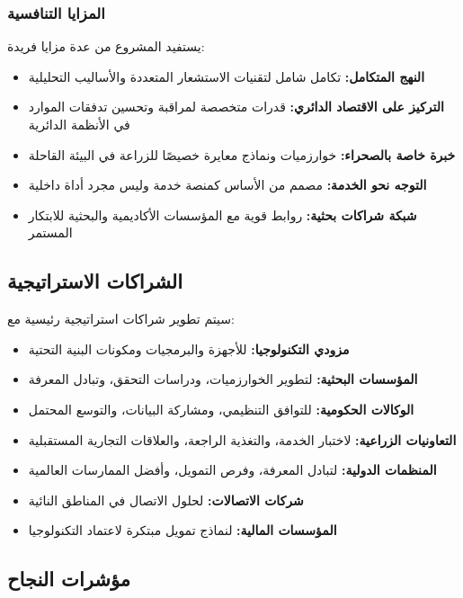 \subsubsection{المزايا التنافسية}
يستفيد المشروع من عدة مزايا فريدة:

\begin{itemize}
    \item \textbf{النهج المتكامل:} تكامل شامل لتقنيات الاستشعار المتعددة والأساليب التحليلية
    \item \textbf{التركيز على الاقتصاد الدائري:} قدرات متخصصة لمراقبة وتحسين تدفقات الموارد في الأنظمة الدائرية
    \item \textbf{خبرة خاصة بالصحراء:} خوارزميات ونماذج معايرة خصيصًا للزراعة في البيئة القاحلة
    \item \textbf{التوجه نحو الخدمة:} مصمم من الأساس كمنصة خدمة وليس مجرد أداة داخلية
    \item \textbf{شبكة شراكات بحثية:} روابط قوية مع المؤسسات الأكاديمية والبحثية للابتكار المستمر
\end{itemize}

\subsection{الشراكات الاستراتيجية}

سيتم تطوير شراكات استراتيجية رئيسية مع:

\begin{itemize}
    \item \textbf{مزودي التكنولوجيا:} للأجهزة والبرمجيات ومكونات البنية التحتية
    \item \textbf{المؤسسات البحثية:} لتطوير الخوارزميات، ودراسات التحقق، وتبادل المعرفة
    \item \textbf{الوكالات الحكومية:} للتوافق التنظيمي، ومشاركة البيانات، والتوسع المحتمل
    \item \textbf{التعاونيات الزراعية:} لاختبار الخدمة، والتغذية الراجعة، والعلاقات التجارية المستقبلية
    \item \textbf{المنظمات الدولية:} لتبادل المعرفة، وفرص التمويل، وأفضل الممارسات العالمية
    \item \textbf{شركات الاتصالات:} لحلول الاتصال في المناطق النائية
    \item \textbf{المؤسسات المالية:} لنماذج تمويل مبتكرة لاعتماد التكنولوجيا
\end{itemize}

\subsection{مؤشرات النجاح}

